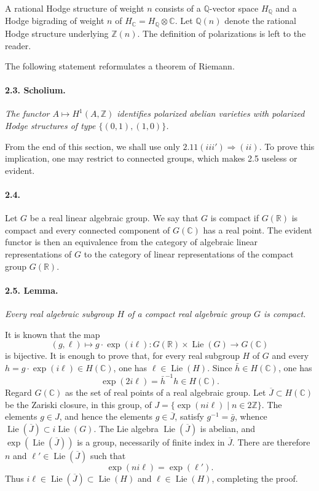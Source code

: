 \documentclass[10pt]{article}
\newcommand{\C}{\mathbb{C}}
\newcommand{\Q}{\mathbb{Q}}
\newcommand{\R}{\mathbb{R}}
\newcommand{\Z}{\mathbb{Z}}
\newcommand{\Lie}{\operatorname{Lie}}
\begin{document}
A rational Hodge structure of weight $n$ consists of a $\Q$-vector space $H_\Q$ and a Hodge bigrading of weight $n$ of $H_\C=H_\Q\otimes\C$. Let $\Q(n)$ denote the rational Hodge structure underlying $\Z(n)$. The definition of polarizations is left to the reader.

The following statement reformulates a theorem of Riemann.

\paragraph{2.3. Scholium.} \emph{The functor $A\mapsto H^1(A,\Z)$ identifies polarized abelian varieties with polarized Hodge structures of type $\{(0,1),(1,0)\}$.}

From the end of this section, we shall use only $2.11(iii')\Rightarrow(ii)$. To prove this implication, one may restrict to connected groups, which makes 2.5 useless or evident.

\paragraph{2.4.} Let $G$ be a real linear algebraic group. We say that $G$ is compact if $G(\R)$ is compact and every connected component of $G(\C)$ has a real point. The evident functor is then an equivalence from the category of algebraic linear representations of $G$ to the category of linear representations of the compact group $G(\R)$.

\paragraph{2.5. Lemma.} \emph{Every real algebraic subgroup $H$ of a compact real algebraic group $G$ is compact.}

It is known that the map
\[
(g,\ell)\longmapsto g\cdot\exp(i\ell):G(\R)\times\Lie(G)\longrightarrow G(\C)
\]
is bijective. It is enough to prove that, for every real subgroup $H$ of $G$ and every $h=g\cdot\exp(i\ell)\in H(\C)$, one has $\ell\in\Lie(H)$. Since $\bar h\in H(\C)$, one has
\[
\exp(2i\ell)=\bar h^{-1}h\in H(\C).
\]
Regard $G(\C)$ as the set of real points of a real algebraic group. Let $\overline J\subset H(\C)$ be the Zariski closure, in this group, of $J=\{\exp(ni\ell)\mid n\in2\Z\}$. The elements $g\in J$, and hence the elements $g\in\overline J$, satisfy $g^{-1}=\bar g$, whence $\Lie(\overline J)\subset i\Lie(G)$. The Lie algebra $\Lie(\overline J)$ is abelian, and $\exp(\Lie(\overline J))$ is a group, necessarily of finite index in $\overline J$. There are therefore $n$ and $\ell'\in\Lie(\overline J)$ such that
\[
\exp(ni\ell)=\exp(\ell').
\]
Thus $i\ell\in\Lie(\overline J)\subset\Lie(H)$ and $\ell\in\Lie(H)$, completing the proof.
\end{document}
